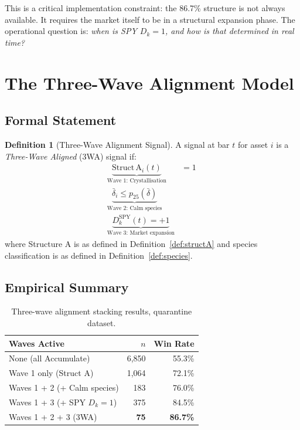 \documentclass[11pt, a4paper]{article}
\newcommand{\Dk}{D_k}
\theoremstyle{definition}
\newtheorem{definition}{Definition}
\begin{document}
This is a critical implementation constraint: the 86.7\% structure is not
always available.
It requires the market itself to be in a structural expansion phase.
The operational question is: \emph{when is SPY $\Dk = 1$, and how is that
determined in real time?}

\section{The Three-Wave Alignment Model}

\subsection{Formal Statement}

\begin{definition}[Three-Wave Alignment Signal]
\label{def:3wave}
A signal at bar $t$ for asset $i$ is a \emph{Three-Wave Aligned} (3WA)
signal if:
\begin{align}
  \underbrace{\mathrm{Struct\,A}_i(t)}_{\text{Wave 1: Crystallisation}}
  &= 1 \label{eq:w1} \\
  \underbrace{\bar{\delta}_i \leq p_{25}(\bar{\delta})}_{\text{Wave 2: Calm species}}
  &\qquad \label{eq:w2} \\
  \underbrace{D_k^{\mathrm{SPY}}(t) = +1}_{\text{Wave 3: Market expansion}}
  &\qquad \label{eq:w3}
\end{align}
where Structure A is as defined in Definition~\ref{def:structA} and
species classification is as defined in Definition~\ref{def:species}.
\end{definition}

\subsection{Empirical Summary}

\begin{table}[h!]
\centering
\caption{Three-wave alignment stacking results, quarantine dataset.}
\begin{tabular}{lrr}
\toprule
\textbf{Waves Active} & \textbf{$n$} & \textbf{Win Rate} \\
\midrule
None (all Accumulate)          & 6{,}850 & 55.3\% \\
Wave 1 only (Struct A)         & 1{,}064 & 72.1\% \\
Waves 1 + 2 (+ Calm species)  & 183     & 76.0\% \\
Waves 1 + 3 (+ SPY $\Dk=1$)  & 375     & 84.5\% \\
Waves 1 + 2 + 3 (3WA)        & \textbf{75} & \textbf{86.7\%} \\
\bottomrule
\end{tabular}
\end{table}
\end{document}
